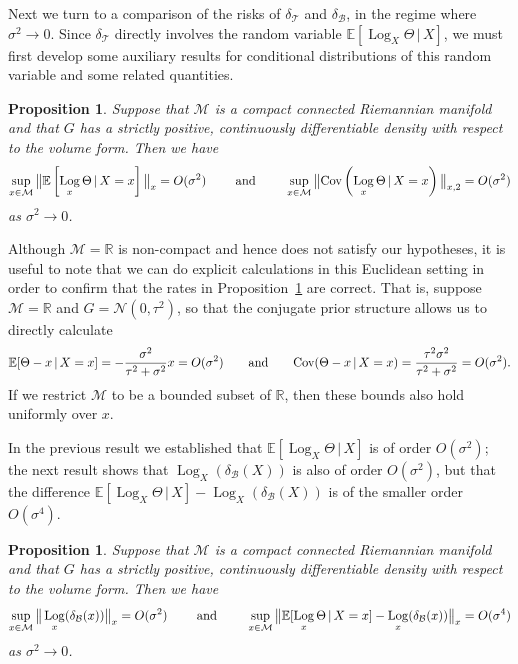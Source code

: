 \documentclass[preprint]{imsart}
\theoremstyle{plain}
\newtheorem{proposition}[theorem]{Proposition}
\theoremstyle{definition}
\newcommand{\Rbb}{\mathbb{R}}
\newcommand{\Ebb}{\mathbb{E}}
\newcommand{\Cov}{\textnormal{Cov}}
\newcommand{\Ncal}{\mathcal{N}}
\newcommand{\Mcal}{\mathcal{M}}
\newcommand{\B}{\mathcal{B}}
\newcommand{\T}{\mathcal{T}}
\DeclareMathOperator{\Log}{Log}
\begin{document}
Next we turn to a comparison of the risks of $\delta_{\T}$ and $\delta_{\B}$, in the regime where $\sigma^2\to 0$.
Since $\delta_{\T}$ directly involves the random variable $\Ebb[\Log_X\Theta\,|\,X]$, we must first develop some auxiliary results for conditional distributions of this random variable and some related quantities.

\begin{proposition}\label{prop:mux-sigmax-estimates}
Suppose that $\Mcal$ is a compact connected Riemannian manifold and that $G$ has a strictly positive, continuously differentiable density with respect to the volume form. Then we have
\begin{equation*}
\sup_{x\in\Mcal} \big\|\Ebb\left[\Log_x\Theta\,|\,X=x\right]\big\|_x = O(\sigma^2)\qquad \textnormal{ and }\qquad \sup_{x\in\Mcal}\big\|\Cov\left(\Log_x\Theta\,|\,X=x\right)\big\|_{x,2} = O(\sigma^2)
\end{equation*}
as $\sigma^2\to 0$.
\end{proposition}

Although $\Mcal=\Rbb$ is non-compact and hence does not satisfy our hypotheses, it is useful to note that we can do explicit calculations in this Euclidean setting in order to confirm that the rates in Proposition~\ref{prop:mux-sigmax-estimates} are correct.
That is, suppose $\Mcal= \Rbb$ and $G=\Ncal(0,\tau^2)$, so that the conjugate prior structure allows us to directly calculate 
\begin{equation*}
    \Ebb[\Theta-x\,|\,X=x] = -\frac{\sigma^2}{\tau^2 + \sigma^2}x = O(\sigma^2)\qquad\textnormal{and}\qquad\Cov(\Theta-x\,|\,X=x) = \frac{\tau^2\sigma^2}{\tau^2 + \sigma^2} = O(\sigma^2).
\end{equation*}
    If we restrict $\Mcal$ to be a bounded subset of $\Rbb$, then these bounds also hold uniformly over $x$.
    
In the previous result we established that $\Ebb[\Log_X\Theta\,|\,X]$ is of order $O(\sigma^2)$; the next result shows that $\Log_X(\delta_{\B}(X))$ is also of order $O(\sigma^2)$, but that the difference $\Ebb[\Log_X\Theta\,|\,X]-\Log_X(\delta_{\B}(X))$ is of the smaller order $O(\sigma^4)$.

\begin{proposition}\label{prop:wB-estimates}
Suppose that $\Mcal$ is a compact connected Riemannian manifold and that $G$ has a strictly positive, continuously differentiable density with respect to the volume form. Then we have
\begin{equation*}
    \sup_{x\in\Mcal} \big\|\Log_x(\delta_{\B}(x)) \big\|_x = O(\sigma^2) \qquad \textnormal{ and }\qquad \sup_{x\in\Mcal}\big\|\Ebb[\Log_x\Theta\,|\,X=x]-\Log_x(\delta_{\B}(x)) \big\|_x = O(\sigma^4)
\end{equation*}
as $\sigma^2\to 0$.
\end{proposition}
\end{document}

